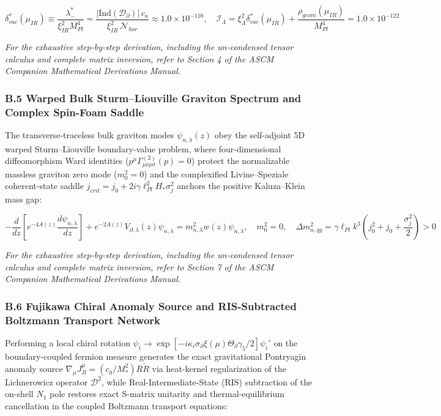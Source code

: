 \documentclass[aps,prd,onecolumn,superscriptaddress,nofootinbib,longbibliography,10pt]{revtex4-2}
\begin{document}
  \[ \delta_{vac}^*(\mu_{IR}) \equiv \frac{\lambda_-^*}{\xi_{IR}^2 M_{Pl}^4} = \frac{|\text{Ind}(\mathcal{D}_\partial)|\,c_\kappa}{\xi_{IR}^2\,\mathcal{N}_{hor}} \approx 1.0 \times 10^{-110}, \quad \mathcal{I}_\Lambda = \xi_\Lambda^2 \delta_{vac}^*(\mu_{IR}) + \frac{\rho_{geom}(\mu_{IR})}{M_{Pl}^4} = 1.0 \times 10^{-122} \]
  
    \textit{For the exhaustive step-by-step derivation, including the un-condensed tensor calculus and complete matrix inversion, refer to Section 4 of the ASCM Companion Mathematical Derivations Manual.}
  

  
\subsubsection*{B.5 Warped Bulk Sturm–Liouville Graviton Spectrum and Complex Spin-Foam Saddle}

  The transverse-traceless bulk graviton modes \(\psi_{n,\lambda}(z)\) obey the self-adjoint 5D warped Sturm–Liouville boundary-value problem, where four-dimensional diffeomorphism Ward identities (\(p^\mu \Gamma_{\mu\nu\rho\sigma}^{(2)}(p) = 0\)) protect the normalizable massless graviton zero mode (\(m_0^2 = 0\)) and the complexified Livine–Speziale coherent-state saddle \(j_{crit} = j_0 + 2i\gamma\ell_{Pl}^2 H_* \sigma_j^2\) anchors the positive Kaluza–Klein mass gap:


  \[ -\frac{d}{dz}\left[ e^{-4A(z)}\frac{d\psi_{n,\lambda}}{dz} \right] + e^{-2A(z)}V_{\partial,\lambda}(z)\psi_{n,\lambda} = m_{n,\lambda}^2 w(z)\psi_{n,\lambda}, \quad m_0^2 = 0, \quad \Delta m_{n,qg}^2 = \gamma\ell_{Pl} k^3\left(j_0^2 + j_0 + \frac{\sigma_j^2}{2}\right) > 0 \]
  
    \textit{For the exhaustive step-by-step derivation, including the un-condensed tensor calculus and complete matrix inversion, refer to Section 7 of the ASCM Companion Mathematical Derivations Manual.}
  

  
\subsubsection*{B.6 Fujikawa Chiral Anomaly Source and RIS-Subtracted Boltzmann Transport Network}

  Performing a local chiral rotation \(\psi_i \to \exp[-i\kappa_i\sigma_\partial\xi(\mu)\Theta_\partial\gamma_5/2]\psi_i'\) on the boundary-coupled fermion measure generates the exact gravitational Pontryagin anomaly source \(\nabla_\mu J_B^\mu = (c_g/M_*^2)R\tilde{R}\) via heat-kernel regularization of the Lichnerowicz operator \(\mathcal{D}^2\), while Real-Intermediate-State (RIS) subtraction of the on-shell \(N_1\) pole restores exact S-matrix unitarity and thermal-equilibrium cancellation in the coupled Boltzmann transport equations:
\end{document}
